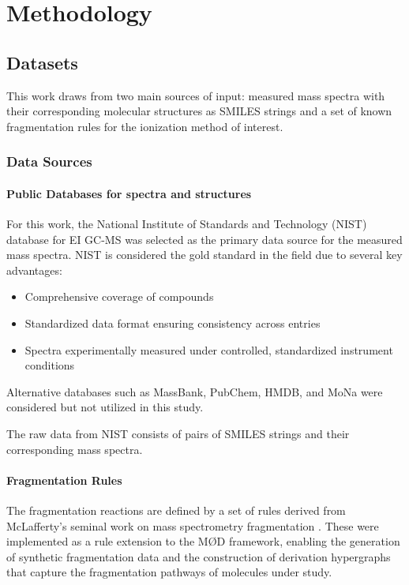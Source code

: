 \chapter{Methodology}
\label{ch:3}
\noindent

\section{Datasets}

This work draws from two main sources of input:
measured mass spectra with their corresponding molecular structures as SMILES strings and a set of known fragmentation rules for the ionization method of interest.

\subsection{Data Sources}

\subsubsection{Public Databases for spectra and structures}

For this work, the National Institute of Standards and Technology (NIST) database for EI GC-MS was selected as the primary data source for the measured mass spectra.
NIST is considered the gold standard in the field due to several key advantages: \cite[p.~3]{Wallace2023}

\begin{itemize}
    \item Comprehensive coverage of compounds
    \item Standardized data format ensuring consistency across entries
    \item Spectra experimentally measured under controlled, standardized instrument conditions
\end{itemize}

Alternative databases such as MassBank, PubChem, HMDB, and MoNa were considered but not utilized in this study.

The raw data from NIST consists of pairs of SMILES strings and their corresponding mass spectra.

\subsubsection{Fragmentation Rules}

The fragmentation reactions are defined by a set of rules derived from McLafferty's seminal work on mass spectrometry fragmentation \cite{McLafferty1993}.
These were implemented as a rule extension to the M\O D framework, enabling the generation of synthetic fragmentation data and the construction of derivation hypergraphs that capture the fragmentation pathways of molecules under study.

